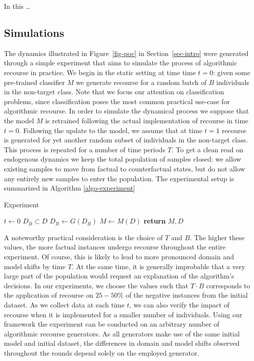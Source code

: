 \documentclass[
  conference]{IEEEtran}
\begin{document}
In this \ldots{}

\hypertarget{sec-method-2-experiment}{%
\subsection{Simulations}\label{sec-method-2-experiment}}

The dynamics illustrated in Figure~\ref{fig-poc} in
Section~\ref{sec-intro} were generated through a simple experiment that
aims to simulate the process of algorithmic recourse in practice. We
begin in the static setting at time time \(t=0\): given some pre-trained
classifier \(M\) we generate recourse for a random batch of \(B\)
individuals in the non-target class. Note that we focus our attention on
classification problems, since classification poses the most common
practical use-case for algorithmic recourse. In order to simulate the
dynamical process we suppose that the model \(M\) is retrained following
the actual implementation of recourse in time \(t=0\). Following the
update to the model, we assume that at time \(t=1\) recourse is
generated for yet another random subset of individuals in the non-target
class. This process is repeated for a number of time periods \(T\). To
get a clean read on endogenous dynamics we keep the total population of
samples closed: we allow existing samples to move from factual to
counterfactual states, but do not allow any entirely new samples to
enter the population. The experimental setup is summarized in Algorithm
\ref{algo-experiment}

\begin{algorithm}
\caption{Experiment}\label{algo-experiment}
\begin{algorithmic}[1]
\State $t\gets 0$
\State $D_B \subset D$
\State $D_B\gets G(D_B)$ 
\State $M\gets M(D)$ 
\EndWhile
\State \textbf{return} $M,D$
\EndProcedure
\end{algorithmic}
\end{algorithm}

A noteworthy practical consideration is the choice of \(T\) and \(B\).
The higher these values, the more factual instances undergo recourse
throughout the entire experiment. Of course, this is likely to lead to
more pronounced domain and model shifts by time \(T\). At the same time,
it is generally improbable that a very large part of the population
would request an explanation of the algorithm's decisions. In our
experiments, we choose the values such that \(T \cdot B\) corresponds to
the application of recourse on \(25-50\%\) of the negative instances
from the initial dataset. As we collect data at each time \(t\), we can
also verify the impact of recourse when it is implemented for a smaller
number of individuals. Using our framework the experiment can be
conducted on an arbitrary number of algorithmic recourse generators. As
all generators make use of the same initial model and initial dataset,
the differences in domain and model shifts observed throughout the
rounds depend solely on the employed generator.
\end{document}
